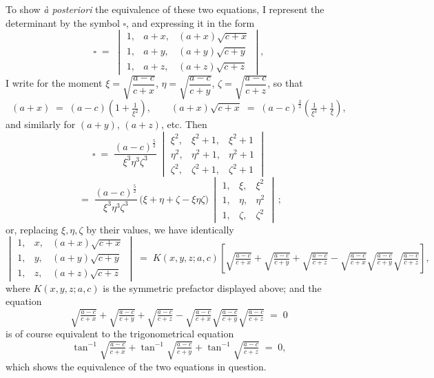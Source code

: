 \documentclass[11pt]{article}
\begin{document}
To show \emph{\`a posteriori} the equivalence of these two equations, I represent the determinant by the symbol $\square$, and expressing it in the form
\[
\square \;=\; \begin{vmatrix} 1, & a + x, & (a + x)\sqrt{c + x} \\[2pt] 1, & a + y, & (a + y)\sqrt{c + y} \\[2pt] 1, & a + z, & (a + z)\sqrt{c + z} \end{vmatrix},
\]
I write for the moment $\xi = \sqrt{\dfrac{a-c}{c+x}}$, $\eta = \sqrt{\dfrac{a-c}{c+y}}$, $\zeta = \sqrt{\dfrac{a-c}{c+z}}$, so that
\[
(a + x) \;=\; (a - c)\!\left(1 + \tfrac{1}{\xi^{2}}\right),\qquad
(a + x)\sqrt{c + x} \;=\; (a - c)^{\frac{3}{2}}\!\left(\tfrac{1}{\xi^{3}} + \tfrac{1}{\xi}\right),
\]
\noindent and similarly for $(a + y)$, $(a + z)$, etc. Then
\[
\square \;=\; \frac{(a - c)^{\frac{5}{2}}}{\xi^{3}\eta^{3}\zeta^{3}}\,
\begin{vmatrix} \xi^{2}, & \xi^{2} + 1, & \xi^{2} + 1 \\ \eta^{2}, & \eta^{2} + 1, & \eta^{2} + 1 \\ \zeta^{2}, & \zeta^{2} + 1, & \zeta^{2} + 1 \end{vmatrix}
\]
\[
\;=\; \frac{(a - c)^{\frac{5}{2}}}{\xi^{3}\eta^{3}\zeta^{3}}\,\bigl(\xi + \eta + \zeta - \xi\eta\zeta\bigr)\,
\begin{vmatrix} 1, & \xi, & \xi^{2} \\ 1, & \eta, & \eta^{2} \\ 1, & \zeta, & \zeta^{2} \end{vmatrix}\,;
\]
or, replacing $\xi, \eta, \zeta$ by their values, we have identically
\[
\begin{vmatrix}
1, & x, & (a + x)\sqrt{c + x} \\
1, & y, & (a + y)\sqrt{c + y} \\
1, & z, & (a + z)\sqrt{c + z}
\end{vmatrix}
\;=\; K(x,y,z;a,c)\!\left[\sqrt{\tfrac{a-c}{c+x}} + \sqrt{\tfrac{a-c}{c+y}} + \sqrt{\tfrac{a-c}{c+z}} - \sqrt{\tfrac{a-c}{c+x}}\sqrt{\tfrac{a-c}{c+y}}\sqrt{\tfrac{a-c}{c+z}}\right],
\]
where $K(x,y,z;a,c)$ is the symmetric prefactor displayed above; and the equation
\[
\sqrt{\tfrac{a-c}{c+x}} + \sqrt{\tfrac{a-c}{c+y}} + \sqrt{\tfrac{a-c}{c+z}} - \sqrt{\tfrac{a-c}{c+x}}\sqrt{\tfrac{a-c}{c+y}}\sqrt{\tfrac{a-c}{c+z}} \;=\; 0
\]
is of course equivalent to the trigonometrical equation
\[
\tan^{-1}\!\sqrt{\tfrac{a-c}{c+x}} + \tan^{-1}\!\sqrt{\tfrac{a-c}{c+y}} + \tan^{-1}\!\sqrt{\tfrac{a-c}{c+z}} \;=\; 0,
\]
which shows the equivalence of the two equations in question.
\end{document}
